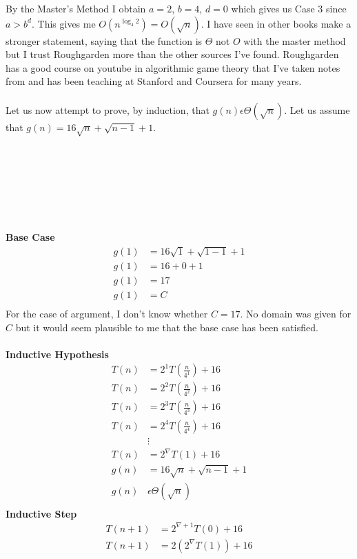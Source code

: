 \documentclass[paper=a4,fontsize=11pt]{article}
\begin{document}
\begin{enumerate}
\begin{enumerate}
By the Master's Method I obtain $a = 2$, $b = 4$, $d = 0$ which gives us Case 3 since $a > b^d$. This gives me $O(n^{\log_4{2}}) = O(\sqrt{n})$. I have seen in other books make a stronger statement, saying that the function is $\Theta$ not $O$ with the master method but I trust Roughgarden more than the other sources I've found. Roughgarden has a good course on youtube in algorithmic game theory that I've taken notes from and has been teaching at Stanford and Coursera for many years.\\\\
Let us now attempt to prove, by induction, that $g(n) \epsilon \Theta(\sqrt{n})$. Let us assume that $g(n) = 16\sqrt{n} + \sqrt{n - 1} + 1$.\\\\\\\\\\\\\\\\
\textbf{Base Case}
\begin{align*}
g(1) &= 16\sqrt{1} + \sqrt{1 - 1} + 1\\
g(1) &= 16 + 0 + 1\\
g(1) &= 17\\
g(1) &= C\\
\end{align*}
For the case of argument, I don't know whether $C=17$. No domain was given for $C$ but it would seem plausible to me that the base case has been satisfied.\\\\
\textbf{Inductive Hypothesis}
\begin{align*}
T(n) &= 2^{1}T(\frac{n}{4^{1}}) + 16\\
T(n) &= 2^{2}T(\frac{n}{4^{2}}) + 16\\
T(n) &= 2^{3}T(\frac{n}{4^{3}}) + 16\\
T(n) &= 2^{4}T(\frac{n}{4^{4}}) + 16\\
&\vdots\\
T(n) &= 2^{\nabla}T(1) + 16\\
g(n) &= 16\sqrt{n} + \sqrt{n - 1} + 1\\
g(n) &\epsilon \Theta(\sqrt{n})\\
\end{align*}
\textbf{Inductive Step}
\begin{align*}
T(n + 1) &= 2^{\nabla+1}T(0) + 16\\
T(n + 1) &= 2(2^{\nabla}T(1)) + 16\\

\end{align*}
\end{enumerate}
\end{enumerate}
\end{document}
